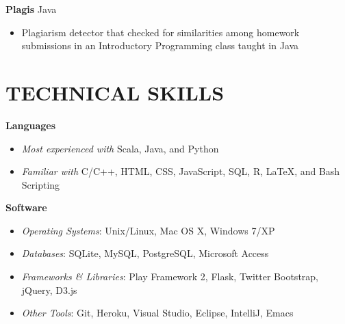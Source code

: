 \documentclass[margin]{res}
\begin{document}
\begin{resume}
\textbf{Plagis} \hfill Java
\begin{itemize}[leftmargin=10pt]
\item Plagiarism detector that checked for similarities among homework submissions in an Introductory Programming class taught in Java
\end{itemize}

\section{TECHNICAL SKILLS}
\textbf{Languages}
\begin{itemize}[leftmargin=10pt]
\item \textit{Most experienced with} Scala, Java, and Python
\item \textit{Familiar with} C/C++, HTML, CSS, JavaScript, SQL, R, \LaTeX{}, and Bash Scripting
\end{itemize}

\textbf{Software}
\begin{itemize}[leftmargin=10pt]
\item \textit{Operating Systems}: Unix/Linux, Mac OS X, Windows 7/XP
\item \textit{Databases}: SQLite, MySQL, PostgreSQL, Microsoft Access
\item \textit{Frameworks \& Libraries}: Play Framework 2, Flask, Twitter Bootstrap, jQuery, D3.js
\item \textit{Other Tools}: Git, Heroku, Visual Studio, Eclipse, IntelliJ, Emacs
\end{itemize}

\end{resume}
\end{document}
